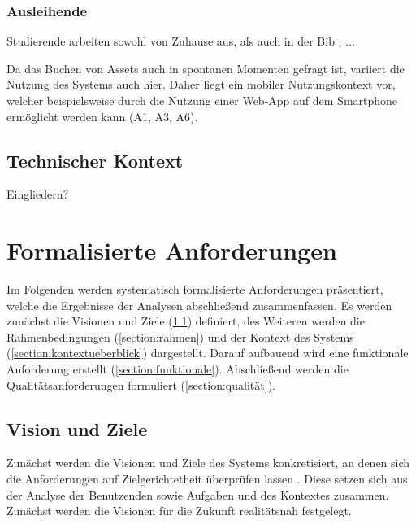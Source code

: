 \subsubsection{Ausleihende}
Studierende arbeiten sowohl von Zuhause aus, als auch in der Bib , ... 

Da das Buchen von Assets auch in spontanen Momenten gefragt ist, variiert die Nutzung des Systems
auch hier. Daher liegt ein mobiler Nutzungskontext vor, welcher beispielsweise durch die Nutzung
einer Web-App auf dem Smartphone ermöglicht werden kann (A1, A3, A6).

\subsection{Technischer Kontext}
Eingliedern?


\section{Formalisierte Anforderungen}
\label{section:anforderung}

Im Folgenden werden systematisch formalisierte Anforderungen präsentiert, welche die Ergebnisse der
Analysen abschließend zusammenfassen. Es werden zunächst die Visionen und Ziele
(\ref{section:visionziel}) definiert, des Weiteren werden die Rahmenbedingungen
(\ref{section:rahmen}) und der Kontext des Systems (\ref{section:kontextueberblick}) dargestellt.
Darauf aufbauend wird eine funktionale Anforderung erstellt (\ref{section:funktionale}).
Abschließend werden die Qualitätsanforderungen formuliert (\ref{section:qualität}).


\subsection{Vision und Ziele}
\label{section:visionziel}
Zunächst werden die Visionen und Ziele des Systems konkretisiert, an denen sich die Anforderungen
auf Zielgerichtetheit überprüfen lassen \cite{balzert2009}. Diese setzen sich aus der Analyse der
Benutzenden sowie Aufgaben und des Kontextes zusammen. Zunächst werden die Visionen für die Zukunft
realitätsnah festgelegt.

